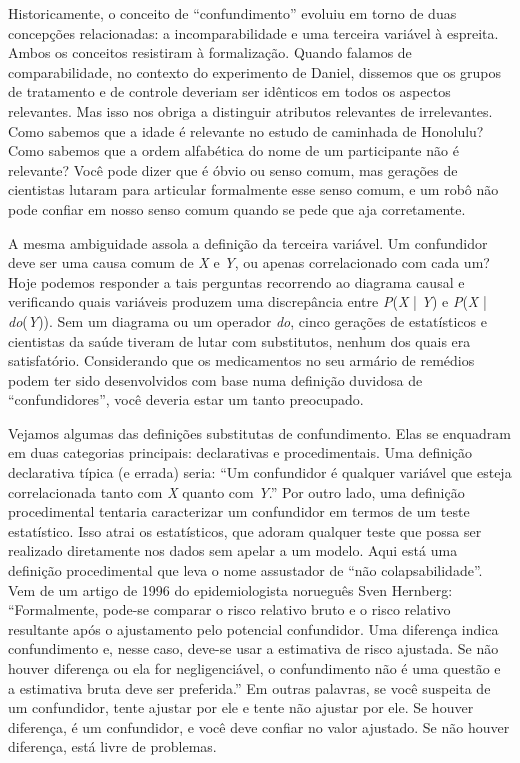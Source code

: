 \documentclass[11pt,a5paper,twoside]{book}
\begin{document}
Historicamente, o conceito de “confundimento” evoluiu em torno de duas concepções relacionadas: a incomparabilidade e uma terceira variável à espreita. Ambos os conceitos resistiram à formalização. Quando falamos de comparabilidade, no contexto do experimento de Daniel, dissemos que os grupos de tratamento e de controle deveriam ser idênticos em todos os aspectos relevantes. Mas isso nos obriga a distinguir atributos relevantes de irrelevantes. Como sabemos que a idade é relevante no estudo de caminhada de Honolulu? Como sabemos que a ordem alfabética do nome de um participante não é relevante? Você pode dizer que é óbvio ou senso comum, mas gerações de cientistas lutaram para articular formalmente esse senso comum, e um robô não pode confiar em nosso senso comum quando se pede que aja corretamente.

A mesma ambiguidade assola a definição da terceira variável. Um confundidor deve ser uma causa comum de \textit{X} e \textit{Y}, ou apenas correlacionado com cada um? Hoje podemos responder a tais perguntas recorrendo ao diagrama causal e verificando quais variáveis produzem uma discrepância entre \textit{P}(\textit{X} | \textit{Y}) e \textit{P}(\textit{X} | \textit{do}(\textit{Y})). Sem um diagrama ou um operador \textit{do}, cinco gerações de estatísticos e cientistas da saúde tiveram de lutar com substitutos, nenhum dos quais era satisfatório. Considerando que os medicamentos no seu armário de remédios podem ter sido desenvolvidos com base numa definição duvidosa de “confundidores”, você deveria estar um tanto preocupado.

Vejamos algumas das definições substitutas de confundimento. Elas se enquadram em duas categorias principais: declarativas e procedimentais. Uma definição declarativa típica (e errada) seria: “Um confundidor é qualquer variável que esteja correlacionada tanto com \textit{X} quanto com \textit{Y}.” Por outro lado, uma definição procedimental tentaria caracterizar um confundidor em termos de um teste estatístico. Isso atrai os estatísticos, que adoram qualquer teste que possa ser realizado diretamente nos dados sem apelar a um modelo. Aqui está uma definição procedimental que leva o nome assustador de “não colapsabilidade”. Vem de um artigo de 1996 do epidemiologista norueguês Sven Hernberg: “Formalmente, pode-se comparar o risco relativo bruto e o risco relativo resultante após o ajustamento pelo potencial confundidor. Uma diferença indica confundimento e, nesse caso, deve-se usar a estimativa de risco ajustada. Se não houver diferença ou ela for negligenciável, o confundimento não é uma questão e a estimativa bruta deve ser preferida.” Em outras palavras, se você suspeita de um confundidor, tente ajustar por ele e tente não ajustar por ele. Se houver diferença, é um confundidor, e você deve confiar no valor ajustado. Se não houver diferença, está livre de problemas.
\end{document}
